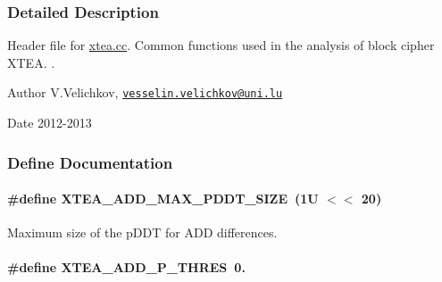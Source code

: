 \subsubsection{\-Detailed \-Description}
\-Header file for \hyperlink{xtea_8cc}{xtea.\-cc}. \-Common functions used in the analysis of block cipher \-X\-T\-E\-A. . \begin{DoxyAuthor}{\-Author}
\-V.\-Velichkov, \href{mailto:vesselin.velichkov@uni.lu}{\tt vesselin.\-velichkov@uni.\-lu} 
\end{DoxyAuthor}
\begin{DoxyDate}{\-Date}
2012-\/2013 
\end{DoxyDate}


\subsubsection{\-Define \-Documentation}
\hypertarget{xtea_8hh_aa79d9e849b88bc759ddf5bef97ed7830}{
\paragraph[{\-X\-T\-E\-A\-\_\-\-A\-D\-D\-\_\-\-M\-A\-X\-\_\-\-P\-D\-D\-T\-\_\-\-S\-I\-Z\-E}]{\setlength{\rightskip}{0pt plus 5cm}\#define {\bf \-X\-T\-E\-A\-\_\-\-A\-D\-D\-\_\-\-M\-A\-X\-\_\-\-P\-D\-D\-T\-\_\-\-S\-I\-Z\-E}~(1\-U $<$$<$ 20)}}\label{xtea_8hh_aa79d9e849b88bc759ddf5bef97ed7830}
\-Maximum size of the p\-D\-D\-T for \-A\-D\-D differences. \hypertarget{xtea_8hh_a33552d767f63f3e835002cbd0bfe52c4}{
\paragraph[{\-X\-T\-E\-A\-\_\-\-A\-D\-D\-\_\-\-P\-\_\-\-T\-H\-R\-E\-S}]{\setlength{\rightskip}{0pt plus 5cm}\#define {\bf \-X\-T\-E\-A\-\_\-\-A\-D\-D\-\_\-\-P\-\_\-\-T\-H\-R\-E\-S}~0.}}\label{xtea_8hh_a33552d767f63f3e835002cbd0bfe52c4}
